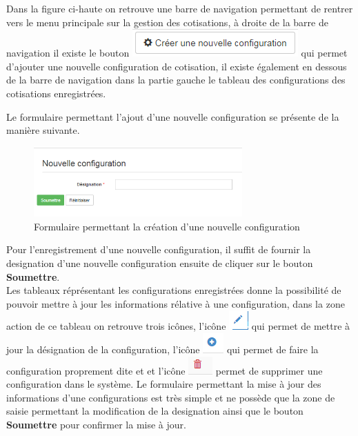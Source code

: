 \documentclass[12pt,a4paper]{report}
\begin{document}
Dans la figure ci-haute on retrouve une barre de navigation permettant de rentrer vers le menu principale sur la gestion des cotisations, à droite de la barre de navigation il existe le bouton \includegraphics[scale=1]{pic/CreatNCRub.png} qui permet d'ajouter une nouvelle configuration de cotisation, il existe également en dessous de la barre de navigation dans la partie gauche le tableau des configurations des cotisations enregistrées.

Le formulaire permettant l'ajout d'une nouvelle configuration se présente de la manière suivante. 

\begin{figure}[h]
\begin{center}
\includegraphics[width=8cm]{pic/NouvCotisation.png}
\end{center}
\caption{Formulaire permettant la création d'une nouvelle configuration}
\label{Formulaire permettant la création d'une nouvelle configuration}
\end{figure} 

\newpage
Pour l'enregistrement d'une nouvelle configuration, il suffit de fournir la designation d'une nouvelle configuration ensuite de cliquer sur le bouton \textbf{Soumettre}.
\\

Les tableaux réprésentant les configurations enregistrées donne la possibilité de pouvoir mettre à jour les informations rélative à une configuration, dans la zone action de ce tableau on retrouve trois icônes, l'icône \includegraphics[scale=0.7]{pic/EditUser.png} qui permet de mettre à jour la désignation de la configuration, l'icône  \includegraphics[scale=0.7]{pic/PlusConfigBlue.png} qui permet de faire la configuration proprement dite et  et l'icône  \includegraphics[scale=0.7]{pic/DeleteWRed.png} permet de supprimer une configuration dans le système.
Le formulaire permettant la mise à jour des informations d'une configurations est très simple et ne possède que la zone de saisie permettant la modification de la designation ainsi que le bouton \textbf{Soumettre} pour confirmer la mise à jour.
\end{document}
